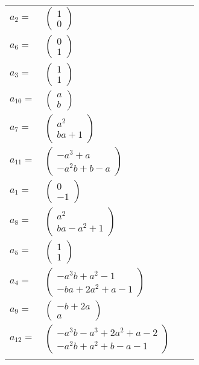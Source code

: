 \documentclass[1p]{elsarticle_modified}
\theoremstyle{definition}
\begin{document}
\begin{tabular}{m{7pt} m{180pt} m{7pt} m{180pt} }
\flushright $a_{2}=$&$\begin{pmatrix}1\\0\end{pmatrix}$ \\
\flushright $a_{6}=$&$\begin{pmatrix}0\\1\end{pmatrix}$ \\
\flushright $a_{3}=$&$\begin{pmatrix}1\\1\end{pmatrix}$ \\
\flushright $a_{10}=$&$\begin{pmatrix}a\\b\end{pmatrix}$ \\
\flushright $a_{7}=$&$\begin{pmatrix}a^2\\b a+1\end{pmatrix}$ \\
\flushright $a_{11}=$&$\begin{pmatrix}- a^3+a\\- a^2 b+b- a\end{pmatrix}$ \\
\flushright $a_{1}=$&$\begin{pmatrix}0\\-1\end{pmatrix}$ \\
\flushright $a_{8}=$&$\begin{pmatrix}a^2\\b a- a^2+1\end{pmatrix}$ \\
\flushright $a_{5}=$&$\begin{pmatrix}1\\1\end{pmatrix}$ \\
\flushright $a_{4}=$&$\begin{pmatrix}- a^3 b+a^2-1\\- b a+2 a^2+a-1\end{pmatrix}$ \\
\flushright $a_{9}=$&$\begin{pmatrix}- b+2 a\\a\end{pmatrix}$ \\
\flushright $a_{12}=$&$\begin{pmatrix}- a^3 b- a^3+2 a^2+a-2\\- a^2 b+a^2+b- a-1\end{pmatrix}$\\&\end{tabular}
\end{document}
